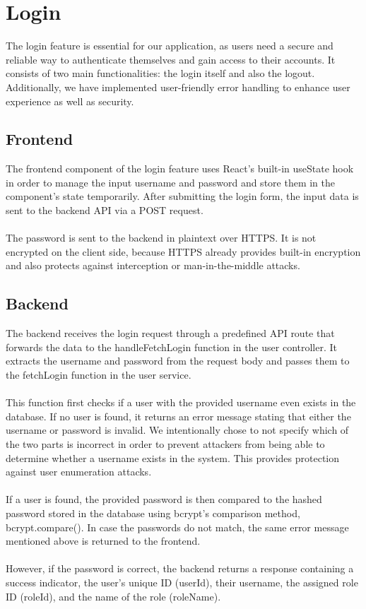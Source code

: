 \documentclass[a4paper,12pt]{report}
\begin{document}
\section{Login}
The login feature is essential for our application, as users need a secure and reliable way to authenticate themselves and gain access to their accounts. It consists of two main functionalities: the login itself and also the logout. Additionally, we have implemented user-friendly error handling to enhance user experience as well as security.
\subsection{Frontend}
The frontend component of the login feature uses React's built-in useState hook in order to manage the input username and password and store them in the component's state temporarily. After submitting the login form, the input data is sent to the backend API via a POST request.\\\\
The password is sent to the backend in plaintext over HTTPS. It is not encrypted on the client side, because HTTPS already provides built-in encryption and also protects against interception or man-in-the-middle attacks.
\subsection{Backend}
The backend receives the login request through a predefined API route that forwards the data to the handleFetchLogin function in the user controller. It extracts the username and password from the request body and passes them to the fetchLogin function in the user service.\\\\
This function first checks if a user with the provided username even exists in the database. If no user is found, it returns an error message stating that either the username or password is invalid. We intentionally chose to not specify which of the two parts is incorrect in order to prevent attackers from being able to determine whether a username exists in the system. This provides protection against user enumeration attacks.\\\\
If a user is found, the provided password is then compared to the hashed password stored in the database using bcrypt's comparison method, bcrypt.compare(). In case the passwords do not match, the same error message mentioned above is returned to the frontend.\\\\
However, if the password is correct, the backend returns a response containing a success indicator, the user's unique ID (userId), their username, the assigned role ID (roleId), and the name of the role (roleName).
\end{document}
